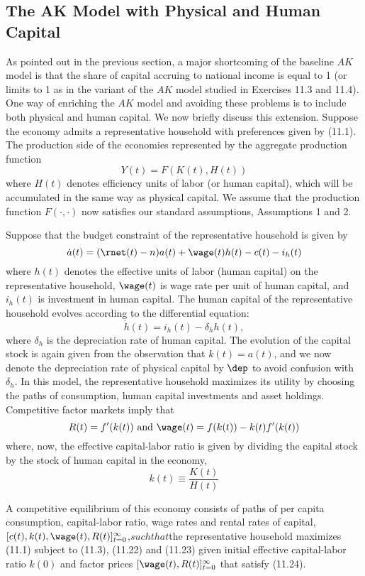 \documentclass[\topdir/lecture\_notes.tex]{subfiles}
\begin{document}
\subsection{The AK Model with Physical and Human Capital}
As pointed out in the previous section, a major shortcoming of the baseline $AK$ model is that the share of capital accruing to national income is equal to 1 (or limits to 1 as in the variant of the $AK$ model studied in Exercises 11.3 and 11.4). One way of enriching the $AK$ model and avoiding these problems is to include both physical and human capital. We now briefly discuss this extension. Suppose the economy admits a representative household with preferences given by (11.1). The production side of the economies represented by the aggregate production function
\[
Y(t)=F(K(t), H(t))
\] where $H(t)$ denotes efficiency units of labor (or human capital), which will be accumulated in the same way as physical capital. We assume that the production function $F(\cdot, \cdot)$ now satisfies our standard assumptions, Assumptions 1 and 2.

Suppose that the budget constraint of the representative household is given by
\[
\dot{a}(t)=(\rnet(t)-n) a(t)+\wage(t) h(t)-c(t)-i_{h}(t)
\] where $h(t)$ denotes the effective units of labor (human capital) on the representative household, $\wage(t)$ is wage rate per unit of human capital, and $i_h(t)$ is investment in human capital. The human capital of the representative household evolves according to the differential equation:
\[
\dot{h}(t)=i_{h}(t)-\delta_{h} h(t),
\] where $\delta_h$ is the depreciation rate of human capital. The evolution of the capital stock is again given from the observation that $k(t)=a(t)$, and we now denote the depreciation rate of physical capital by $\dep$ to avoid confusion with $\delta_h$. In this model, the representative household maximizes its utility by choosing the paths of consumption, human capital investments and asset holdings. Competitive factor markets imply that
\[
R(t)=f^{\prime}(k(t)) \text { and } \wage(t)=f(k(t))-k(t) f^{\prime}(k(t))
\]
where, now, the effective capital-labor ratio is given by dividing the capital stock by the stock of human capital in the economy,
\[
k(t) \equiv \frac{K(t)}{H(t)}
\]

A competitive equilibrium of this economy consists of paths of per capita consumption, capital-labor ratio, wage rates and rental rates of capital, $[c(t), k(t), \wage(t), R(t)]_{t=0}^{\infty}$,$ such that $the representative household maximizes (11.1) subject to (11.3), (11.22) and (11.23) given initial effective capital-labor ratio $k(0)$ and factor prices $[\wage(t), R(t)]_{t=0}^{\infty}$ that satisfy (11.24).
\end{document}
